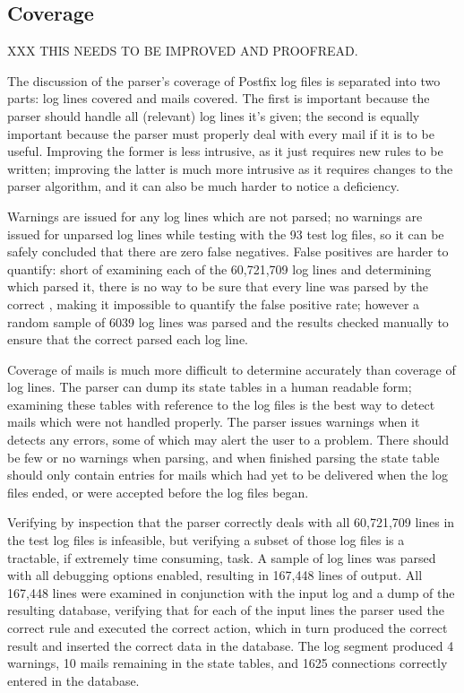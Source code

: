 \documentclass[draft]{svmult}
\newcommand{\numberOFlogFILES}[0]{%
    93%
}
\begin{document}
\subsection{Coverage}

\label{coverage}

XXX THIS NEEDS TO BE IMPROVED AND PROOFREAD\@.

The discussion of the parser's coverage of Postfix log files is separated
into two parts: log lines covered and mails covered.  The first is
important because the parser should handle all (relevant) log lines it's
given; the second is equally important because the parser must properly
deal with every mail if it is to be useful.  Improving the former is less
intrusive, as it just requires new rules to be written; improving the
latter is much more intrusive as it requires changes to the parser
algorithm, and it can also be much harder to notice a deficiency.

Warnings are issued for any log lines which are not parsed; no warnings are
issued for unparsed log lines while testing with the \numberOFlogFILES{}
test log files, so it can be safely concluded that there are zero false
negatives.  False positives are harder to quantify: short of examining each
of the 60,721,709 log lines and determining which \regex{} parsed it, there
is no way to be sure that every line was parsed by the correct \regex{},
making it impossible to quantify the false positive rate; however a random
sample of 6039 log lines was parsed and the results checked manually to
ensure that the correct \regex{} parsed each log line.

Coverage of mails is much more difficult to determine accurately than
coverage of log lines.  The parser can dump its state tables in a human
readable form; examining these tables with reference to the log files is
the best way to detect mails which were not handled properly.  The parser
issues warnings when it detects any errors, some of which may alert the
user to a problem.  There should be few or no warnings when parsing, and
when finished parsing the state table should only contain entries for mails
which had yet to be delivered when the log files ended, or were accepted
before the log files began.

Verifying by inspection that the parser correctly deals with all 60,721,709
lines in the test log files is infeasible, but verifying a subset of those
log files is a tractable, if extremely time consuming, task.  A sample of
log lines was parsed with all debugging options enabled, resulting in
167,448 lines of output.  All 167,448 lines were examined in conjunction
with the input log and a dump of the resulting database, verifying that for
each of the input lines the parser used the correct rule and executed the
correct action, which in turn produced the correct result and inserted the
correct data in the database.  The log segment produced 4 warnings, 10
mails remaining in the state tables, and 1625 connections correctly entered
in the database.
\end{document}
